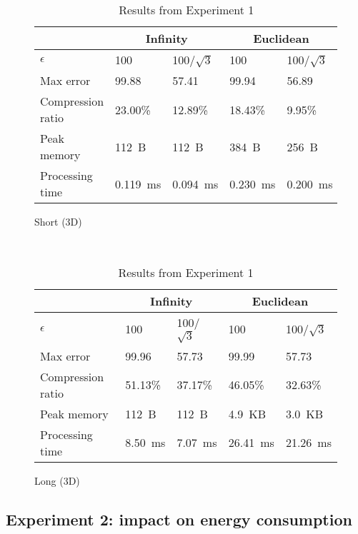 \documentclass[10pt, conference, compsocconf]{IEEEtran}
\begin{document}
\begin{table}
\begin{subfigure}{\columnwidth}
\begin{tabular}{l|l|l|l|l}
    \hline
    \rowcolor{headcolor}
                            & \multicolumn{2}{c|}{Infinity} & \multicolumn{2}{c}{Euclidean} \\ \hline
    $\epsilon$             & 100          & 100/$\sqrt{3}$  & 100         & 100/$\sqrt{3}$   \\ 
    Max error              & 99.88       & 57.41           & 99.94       & 56.89            \\ 
    Compression ratio      & 23.00\%      & 12.89\%         & 18.43\%     & 9.95\%           \\ 
    Peak memory            & 112~B         & 112~B            & 384~B        & 256~B             \\ 
    Processing time        & 0.119~ms      & 0.094~ms         & 0.230~ms     & 0.200~ms          \\ \hline
    \end{tabular}
    \caption{Short (3D)}
    \end{subfigure}\\
    \begin{subfigure}{\columnwidth}
    \centering
    \begin{tabular}{l|l|l|l|l}
    \hline
    \rowcolor{headcolor}
                              & \multicolumn{2}{c|}{Infinity} & \multicolumn{2}{c}{Euclidean} \\ \hline
    $\epsilon$                & 100        & 100/$\sqrt{3}$    & 100        & 100/$\sqrt{3}$    \\
    Max error                 & 99.96     & 57.73             & 99.99      & 57.73             \\
    Compression ratio         & 51.13\%    & 37.17\%           & 46.05\%    & 32.63\%           \\
    Peak memory & 112~B        & 112~B              & 4.9~KB      & 3.0~KB             \\
    Processing time           & 8.50~ms     & 7.07~ms            & 26.41~ms    & 21.26~ms           \\ \hline
    \end{tabular}
    \caption{Long (3D)}
    \end{subfigure}
    \caption{Results from Experiment 1}
    \label{table:results-validation}
\end{table}

\subsection{Experiment 2: impact on energy consumption}
\end{document}
